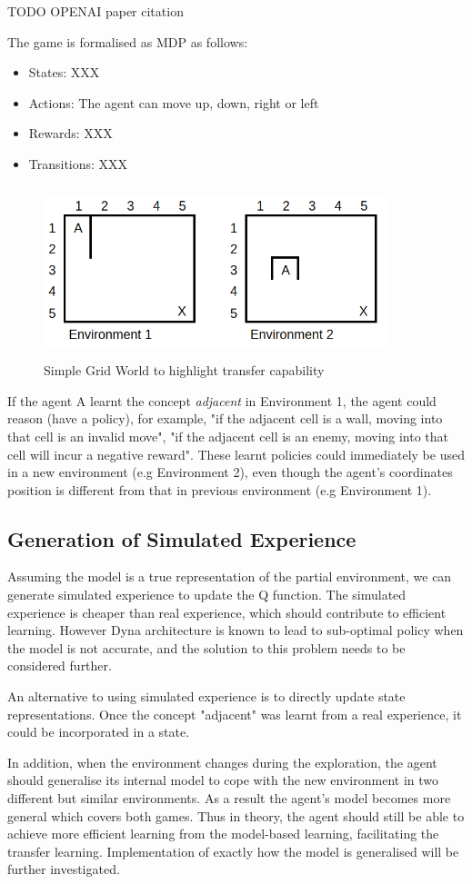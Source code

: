 TODO OPENAI paper citation

The game is formalised as MDP as follows:

\begin{itemize}

\item States: XXX
\item Actions: The agent can move up, down, right or left
\item Rewards: XXX
\item Transitions: XXX

\end{itemize}

\begin{figure}[!htb]
\centering
\includegraphics[width=10cm, height=5cm]{./figures/grid_world}
\caption{Simple Grid World to highlight transfer capability }
\label{grid_world}
\end{figure}
If the agent A learnt the concept \textit{adjacent} in Environment 1, the agent could reason (have a policy), for example, "if the adjacent cell is a wall, moving into that cell is an invalid move", "if the adjacent cell is an enemy, 
moving into that cell will incur a negative reward". These learnt policies could immediately be used in a new environment (e.g Environment 2), even though the agent's coordinates position is different from that in previous environment (e.g Environment 1).

\subsection{Generation of Simulated Experience}
Assuming the model is  a true representation of the partial environment, we can generate simulated experience to update the Q function. The simulated experience is cheaper than real experience, 
which should contribute to efficient learning. However Dyna architecture is known to lead to sub-optimal policy when the model is not accurate, and the solution to this problem needs to be considered further.

An alternative to using simulated experience is to directly update state representations. Once the concept "adjacent"  was learnt from a real experience, it could be incorporated in a state.

In addition, when the environment changes during the exploration, the agent should generalise its internal model to cope with the new environment in two different but similar environments. 
As a result the agent's model becomes more general which covers both games. Thus in theory, the agent should still be able to achieve more efficient learning from the model-based learning, facilitating the transfer learning.
Implementation of exactly how the model is generalised will be further investigated.
